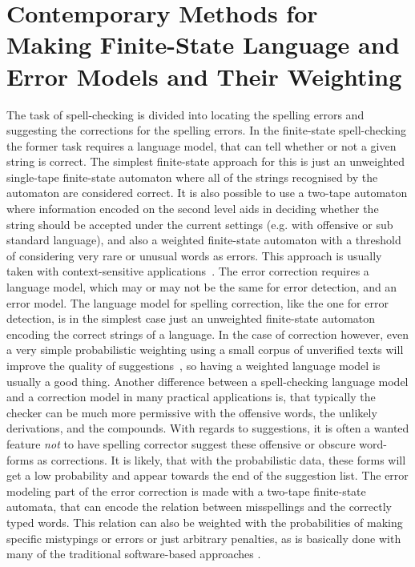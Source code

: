 \documentclass[a4paper,12pt]{article}
\begin{document}
\section{Contemporary Methods for Making Finite-State Language and Error Models
and Their Weighting}
\label{sec:methods}

The task of spell-checking is divided into locating the spelling errors and
suggesting the corrections for the spelling errors. In the finite-state
spell-checking the former task requires a language model, that can tell whether
or not a given string is correct. The simplest finite-state approach for this
is just an unweighted single-tape finite-state automaton where all of the
strings recognised by the automaton are considered correct. It is also possible
to use a two-tape automaton where information encoded on the second level aids
in deciding whether the string should be accepted under the current settings
(e.g.  with offensive or sub standard language), and also a weighted
finite-state automaton with a threshold of considering very rare or unusual
words as errors.  This approach is usually taken with context-sensitive
applications~\cite[]{otero/2007}. The error correction requires a language
model, which may or may not be the same for error detection, and an error
model.  The language model for spelling correction, like the one for error
detection, is in the simplest case just an unweighted finite-state automaton
encoding the correct strings of a language. In the case of correction however,
even a very simple probabilistic weighting using a small corpus of unverified
texts will improve the quality of suggestions~\cite[]{pirinen/2010/lrec}, so
having a weighted language model is usually a good thing. Another difference
between a spell-checking language model and a correction model in many
practical applications is, that typically the checker can be much more
permissive with the offensive words, the unlikely derivations, and the
compounds. With regards to suggestions, it is often a wanted feature \emph{not}
to have spelling corrector suggest these offensive or obscure word-forms as
corrections. It is likely, that with the probabilistic data, these forms will
get a low probability and appear towards the end of the suggestion list. The
error modeling part of the error correction is made with a two-tape
finite-state automata, that can encode the relation between misspellings and
the correctly typed words. This relation can also be weighted with the
probabilities of making specific mistypings or errors or just arbitrary
penalties, as is basically done with many of the traditional software-based
approaches \cite[such as][]{Hunspell/manual}.
\end{document}
